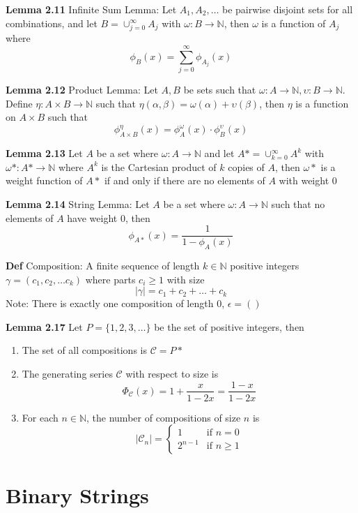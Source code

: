\documentclass[11pt,notitlepage]{report}
\newcommand{\bb}[1]{\ensuremath{\mathbb{#1}}}
\newcommand{\mc}[1]{\ensuremath{\mathcal{#1}}}
\begin{document}
\textbf{Lemma 2.11} Infinite Sum Lemma: Let $A_1, A_2, \dots$ be pairwise disjoint sets for all combinations, and let $B = \cup_{j=0}^\infty A_j$ with $\omega: B \to \bb N$, then $\omega$ is a function of $A_j$ where
$$\phi_{B}(x) = \sum_{j=0}^\infty \phi_{A_j}(x)$$

\textbf{Lemma 2.12} Product Lemma: Let $A, B$ be sets such that $\omega: A \to \bb N, \upsilon: B \to \bb N$. Define $\eta: A \times B \to \bb N$ such that $\eta(\alpha, \beta) = \omega(\alpha) + \upsilon(\beta)$, then $\eta$ is a function on $A \times B$ such that
$$\phi^\eta_{A \times B}(x) = \phi^\omega_A(x) \cdot \phi^\upsilon_B(x)$$

\textbf{Lemma 2.13} Let $A$ be a set where $\omega: A \to \bb N$ and let $A* = \cup_{k=0}^\infty A^k$ with $\omega*: A* \to \bb N$ where $A^k$ is the Cartesian product of $k$ copies of $A$, then $\omega*$ is a weight function of $A*$ if and only if there are no elements of $A$ with weight 0

\textbf{Lemma 2.14} String Lemma: Let $A$ be a set where $\omega: A \to \bb N$ such that no elements of $A$ have weight 0, then
$$\phi_{A*}(x) = \frac{1}{1-\phi_A(x)}$$

\textbf{Def} Composition: A finite sequence of length $k \in \bb N$ positive integers $\gamma = (c_1, c_2, \dots c_k)$ where parts $c_i \geq 1$ with size
$$|\gamma| = c_1 + c_2 + \dots + c_k$$
\hspace*{5mm} Note: There is exactly one composition of length $0$, $\epsilon = ()$

\textbf{Lemma 2.17} Let $P = \{1, 2, 3, \dots\}$ be the set of positive integers, then
\begin{enumerate}[label=\alph*)]
    \item The set of all compositions is $\mc C = P*$
    \item The generating series $\mc C$ with respect to size is
    $$\Phi_{\mc C}(x) = 1 + \frac{x}{1-2x} = \frac{1-x}{1-2x}$$
    \item For each $n \in \bb N$, the number of compositions of size $n$ is
    $$|\mc C_n| = \begin{cases}1&\text{if }n=0\\2^{n-1}&\text{if }n \geq 1   \end{cases}$$
\end{enumerate}

\newpage
\section{Binary Strings}
\end{document}
